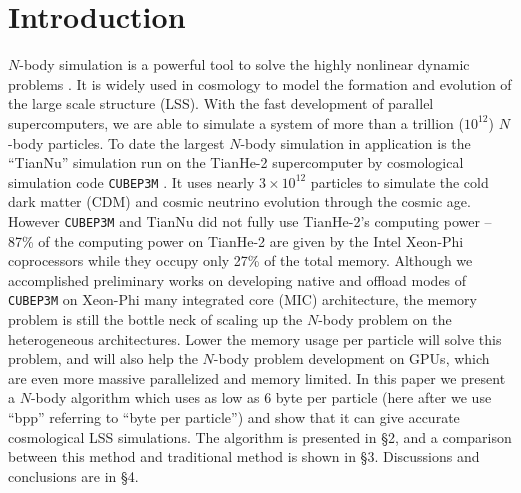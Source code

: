\documentclass[10pt,twocolumn,preprint]{emulateapj}
\begin{document}
\section{Introduction}
$N$-body simulation is a powerful tool to solve the highly nonlinear dynamic problems \citep{1988csup.book.....H}. It is widely used in cosmology to model the formation and evolution of the large scale structure (LSS). With the fast development of parallel supercomputers, we are able to simulate a system of more than a trillion ($10^{12}$) $N$-body particles. To date the largest $N$-body simulation in application is the ``TianNu'' simulation run on the TianHe-2 supercomputer by cosmological simulation code {\tt CUBEP3M} \citep{2013MNRAS.436..540H}. It uses nearly $3\times 10^{12}$ particles to simulate the cold dark matter (CDM) and cosmic neutrino evolution through the cosmic age. However {\tt CUBEP3M} and TianNu did not fully use TianHe-2's computing power -- 87\% of the computing power on TianHe-2 are given by the Intel Xeon-Phi coprocessors while they occupy only 27\% of the total memory. Although we accomplished preliminary works on developing native and offload modes of {\tt CUBEP3M} on Xeon-Phi many integrated core (MIC) architecture, the memory problem is still the bottle neck of scaling up the $N$-body problem on the heterogeneous architectures. Lower the memory usage per particle will solve this problem, and will also help the $N$-body problem development on GPUs, which are even more massive parallelized and memory limited. In this paper we present a $N$-body algorithm which uses as low as 6 byte per particle (here after we use ``bpp'' referring to ``byte per particle'') and show that it can give accurate cosmological LSS simulations. The algorithm is presented in \S 2, and a comparison between this method and traditional method is shown in \S 3. Discussions and conclusions are in \S 4.
\end{document}
